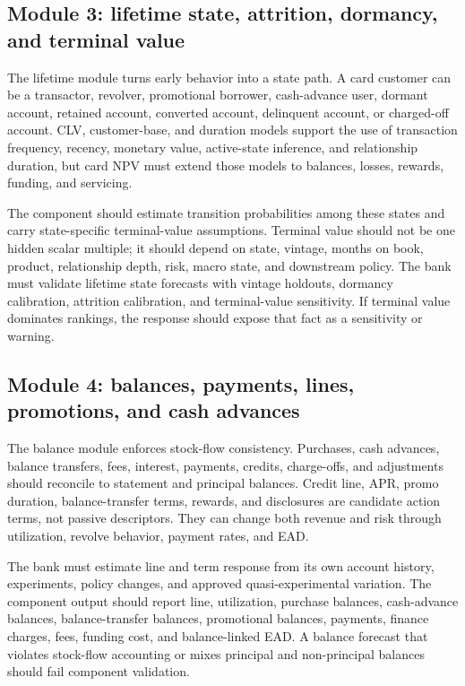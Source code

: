 \documentclass[11pt]{article}
\newcommand{\1}{\mathbf{1}}
\begin{document}
\subsection{Module 3: lifetime state, attrition, dormancy, and terminal value}
\label{subsec:module-lifetime}

The lifetime module turns early behavior into a state path. A card customer
can be a transactor, revolver, promotional borrower, cash-advance user,
dormant account, retained account, converted account, delinquent account, or
charged-off account. CLV, customer-base, and duration models support the use
of transaction frequency, recency, monetary value, active-state inference, and
relationship duration, but card NPV must extend those models to balances,
losses, rewards, funding, and servicing.

The component should estimate transition probabilities among these states and
carry state-specific terminal-value assumptions. Terminal value should not be
one hidden scalar multiple; it should depend on state, vintage, months on book,
product, relationship depth, risk, macro state, and downstream policy. The
bank must validate lifetime state forecasts with vintage holdouts, dormancy
calibration, attrition calibration, and terminal-value sensitivity. If terminal
value dominates rankings, the response should expose that fact as a sensitivity
or warning.

\subsection{Module 4: balances, payments, lines, promotions, and cash advances}
\label{subsec:module-balances}

The balance module enforces stock-flow consistency. Purchases, cash advances,
balance transfers, fees, interest, payments, credits, charge-offs, and
adjustments should reconcile to statement and principal balances. Credit line,
APR, promo duration, balance-transfer terms, rewards, and disclosures are
candidate action terms, not passive descriptors. They can change both revenue
and risk through utilization, revolve behavior, payment rates, and EAD.

The bank must estimate line and term response from its own account history,
experiments, policy changes, and approved quasi-experimental variation. The
component output should report line, utilization, purchase balances,
cash-advance balances, balance-transfer balances, promotional balances,
payments, finance charges, fees, funding cost, and balance-linked EAD. A
balance forecast that violates stock-flow accounting or mixes principal and
non-principal balances should fail component validation.
\end{document}
